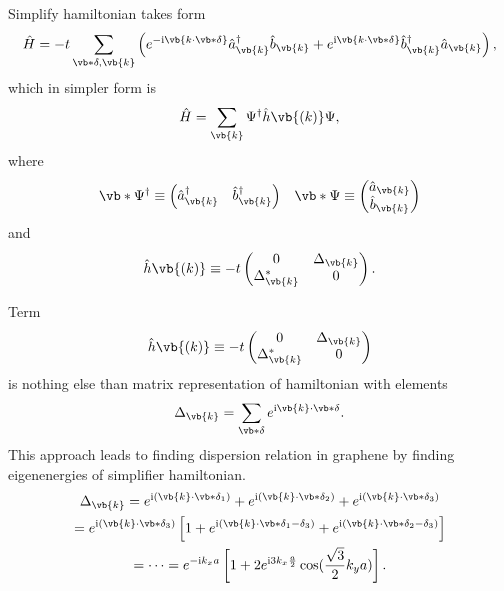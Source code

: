 \documentclass{beamer}
\newcommand{\imag}{\text{i}}
\begin{document}
\begin{frame}
	Simplify hamiltonian takes form
	\begin{equation}
		\hat{H} = -t\sum_{\vb*{\delta},\vb{k}}\left(e^{-\imag\vb{k\cdot\vb*{\delta}}}\hat{a}^\dagger_{\vb{k}}\hat{b}_{\vb{k}}  + e^{\imag\vb{k\cdot\vb*{\delta}}}\hat{b}^\dagger_{\vb{k}}\hat{a}_{\vb{k}} \right),
	\end{equation}
	which in simpler form is
	\begin{equation}
		\hat{H} = \sum_{\vb{k}} \Psi^\dagger \hat{h}\vb{(k)} \Psi,
	\end{equation}
	where
	\begin{equation}
		\vb*{\Psi}^\dagger \equiv
		\begin{pmatrix}
			\hat{a}^\dagger_{\vb{k}} & \hat{b}^\dagger_{\vb{k}}
		\end{pmatrix}
		\; \; \;
		\vb*{\Psi} \equiv
		\begin{pmatrix}
			\hat{a}_{\vb{k}} \\ \hat{b}_{\vb{k}}
		\end{pmatrix}
	\end{equation}
	and
	\begin{equation}
		\hat{h}\vb{(k)} \equiv -t
		\begin{pmatrix}
			0                 & \Delta_{\vb{k}} \\
			\Delta_{\vb{k}}^* & 0
		\end{pmatrix}.
	\end{equation}
\end{frame}

\begin{frame}
	Term
	\begin{equation}
		\hat{h}\vb{(k)} \equiv -t
		\begin{pmatrix}
			0                 & \Delta_{\vb{k}} \\
			\Delta_{\vb{k}}^* & 0
		\end{pmatrix}
	\end{equation}
	is nothing else than matrix representation of hamiltonian with elements
	\begin{equation}
		\Delta_{\vb{k}} = \sum_{\vb*{\delta}} e^{\imag \vb{k}\cdot \vb*{\delta}}.
	\end{equation}
	This approach leads to finding dispersion relation in graphene by finding eigenenergies of simplifier hamiltonian.
	\begin{gather}
		\Delta_{\vb{k}} = e^{\imag(\vb{k}\cdot\vb*{\delta_1})} + e^{\imag(\vb{k}\cdot\vb*{\delta_2})} + e^{\imag(\vb{k}\cdot\vb*{\delta_3})}
		\\
		=
		e^{\imag(\vb{k}\cdot\vb*{\delta_3})}\left[1
			+ e^{\imag(\vb{k}\cdot\vb*{\delta_1 - \delta_3})} + e^{\imag(\vb{k}\cdot\vb*{\delta_2 - \delta_3})}
			\right]
		\\
		=
		\dots
		=
		e^{-\imag k_x a}\left[1 + 2e^{\imag 3k_x\frac{a}{2}}\cos(\frac{\sqrt{3}}{2}k_y a) \right].
	\end{gather}
\end{frame}
\end{document}
